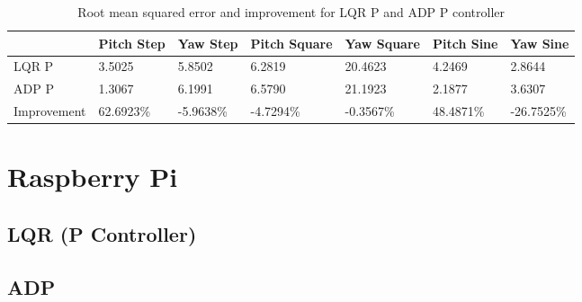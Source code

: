 \begin{table}
    \centering
    \begin{tabular}{l|l|l|l|l|l|l}
        \toprule
        \textbf{} & \textbf{Pitch Step} & \textbf{Yaw Step} & \textbf{Pitch Square} & \textbf{Yaw Square} & \textbf{Pitch Sine} & \textbf{Yaw Sine}\\
        \toprule
        LQR P & 3.5025 & 5.8502 & 6.2819 & 20.4623 & 4.2469 & 2.8644\\
        ADP P & 1.3067 & 6.1991 & 6.5790 & 21.1923 & 2.1877 & 3.6307\\
        Improvement & 62.6923\% & -5.9638\%  & -4.7294\% & -0.3567\% & 48.4871\% & -26.7525\% \\
    \end{tabular}
    \caption{Root mean squared error and improvement for LQR P and ADP P controller}
    \label{tab:RMSE_LQR_ADP}
\end{table}

\section{Raspberry Pi}

\subsection{LQR (P Controller)}

\subsection{ADP}

